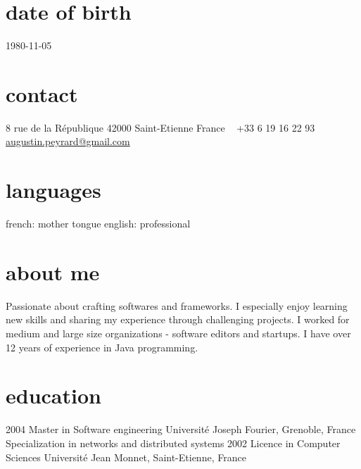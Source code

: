 \documentclass[]{k-cv} %
\begin{document}


\begin{aside} %
\section{date of birth}
\color{gray}1980-11-05
\section{contact}
8 rue de la R\'{e}publique
42000 Saint-Etienne
France
~
+33 6 19 16 22 93
~
\href{mailto:augustin.peyrard@gmail.com}{augustin.peyrard@gmail.com}
\section{languages}
french: mother tongue
english: professional
\end{aside}


\section{about me}
{Passionate about crafting softwares and frameworks.
I especially enjoy learning new skills and sharing my experience through challenging projects.
I worked for medium and large size organizations - software editors and startups.
I have over 12 years of experience in Java programming.}


\section{education}

\begin{entrylist}
\entry
{2004}
{Master {\normalfont in Software engineering}}
{Universit\'{e} Joseph Fourier, Grenoble, France}
{Specialization in networks and distributed systems}
\entry
{2002}
{Licence {\normalfont in Computer Sciences}}
{Universit\'{e} Jean Monnet, Saint-Etienne, France}
{}
\end{entrylist}
\end{document}
